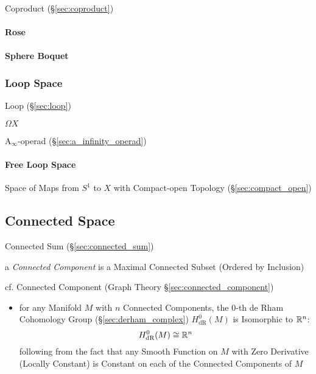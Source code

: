 Coproduct (\S\ref{sec:coproduct})



\paragraph{Rose}\label{sec:rose}\hfill

\paragraph{Sphere Boquet}\label{sec:sphere_boquet}\hfill



\subsubsection{Loop Space}\label{sec:loop_space}

Loop (\S\ref{sec:loop})

$\Omega X$

A$_\infty$-operad (\S\ref{sec:a_infinity_operad})



\paragraph{Free Loop Space}\label{sec:free_loop_space}\hfill

Space of Maps from $S^1$ to $X$ with Compact-open Topology
(\S\ref{sec:compact_open})



\subsection{Connected Space}\label{sec:connected_space}

\fist Connected Sum (\S\ref{sec:connected_sum})

a \emph{Connected Component} is a Maximal Connected Subset (Ordered by
Inclusion)

\fist cf. Connected Component (Graph Theory \S\ref{sec:connected_component})

\begin{itemize}
  \item for any Manifold $M$ with $n$ Connected Components, the $0$-th de Rham
    Cohomology Group (\S\ref{sec:derham_complex}) $H_{\mathrm{dR}}^0(M)$ is
    Isomorphic to $\mathbb{R}^n$:
    \[
      H_{\mathrm{dR}}^0(M) \cong \mathbb{R}^n
    \]
    following from the fact that any Smooth Function on $M$ with Zero Derivative
    (Locally Constant) is Constant on each of the Connected Components of $M$
\end{itemize}




